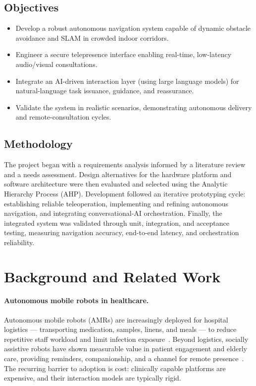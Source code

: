 \documentclass[11pt,a4paper]{article}
\begin{document}
\subsection{Objectives}
\begin{itemize}[leftmargin=*]
    \item Develop a robust autonomous navigation system capable of dynamic obstacle avoidance and SLAM in crowded indoor corridors.
    \item Engineer a secure telepresence interface enabling real-time, low-latency audio/visual consultations.
    \item Integrate an AI-driven interaction layer (using large language models) for natural-language task issuance, guidance, and reassurance.
    \item Validate the system in realistic scenarios, demonstrating autonomous delivery and remote-consultation cycles.
\end{itemize}

\subsection{Methodology}
The project began with a requirements analysis informed by a literature review and a needs assessment. Design alternatives for the hardware platform and software architecture were then evaluated and selected using the Analytic Hierarchy Process (AHP). Development followed an iterative prototyping cycle: establishing reliable teleoperation, implementing and refining autonomous navigation, and integrating conversational-AI orchestration. Finally, the integrated system was validated through unit, integration, and acceptance testing, measuring navigation accuracy, end-to-end latency, and orchestration reliability.

\section{Background and Related Work}
\label{sec:background}

\paragraph{Autonomous mobile robots in healthcare.}
Autonomous mobile robots (AMRs) are increasingly deployed for hospital logistics --- transporting medication, samples, linens, and meals --- to reduce repetitive staff workload and limit infection exposure~\cite{frontiers2024}. Beyond logistics, socially assistive robots have shown measurable value in patient engagement and elderly care, providing reminders, companionship, and a channel for remote presence~\cite{broekens2009}. The recurring barrier to adoption is cost: clinically capable platforms are expensive, and their interaction models are typically rigid.
\end{document}
